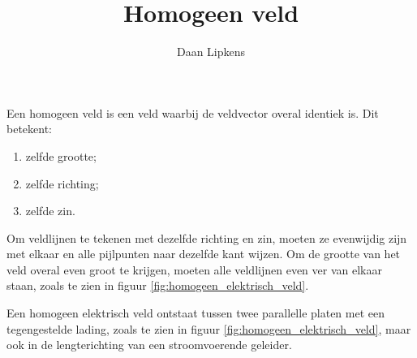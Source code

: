 \documentclass{ximera}
\title{Homogeen veld}
\author{Daan Lipkens}
\begin{document}
\begin{abstract}
    
\end{abstract}
\maketitle

\begin{proposition}[foldable=true]
Een homogeen veld is een veld waarbij de veldvector overal identiek is. Dit betekent:
\begin{enumerate}
    \item zelfde grootte;
    \item zelfde richting;
    \item zelfde zin.
\end{enumerate}
\end{proposition}
Om veldlijnen te tekenen met dezelfde richting en zin, moeten ze evenwijdig zijn met elkaar en alle pijlpunten naar dezelfde kant wijzen. Om de grootte van het veld overal even groot te krijgen, moeten alle veldlijnen even ver van elkaar staan, zoals te zien in figuur \ref{fig:homogeen_elektrisch_veld}.
\begin{remark}[expandable=true]
Een homogeen elektrisch veld ontstaat tussen twee parallelle platen met een tegengestelde lading, zoals te zien in figuur \ref{fig:homogeen_elektrisch_veld}, maar ook in de lengterichting van een stroomvoerende geleider.
\end{remark}
\end{document}
